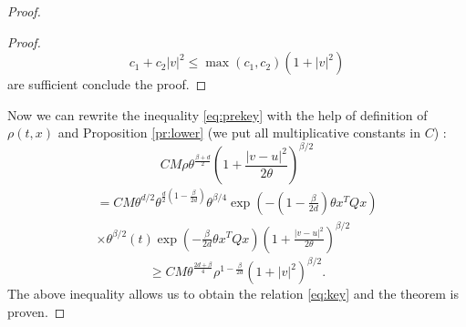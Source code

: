 \begin{proof}
\begin{proof}
\[c_1+c_2|v|^2\le \max (c_1,c_2)(1+|v|^2)\]
are sufficient conclude the proof.
\end{proof}
Now we can rewrite the inequality \eqref{eq:prekey} with the help of definition of $\rho(t,x)$ and Proposition \ref{pr:lower} (we put all multiplicative constants in $C$) :
\[CM \rho \theta^{\frac{\beta+d}{2}}\left(1+\frac{|v-u|^2}{2 \theta}\right)^{\beta/2}\]
\[\begin{split}
	=CM \theta^{d/2} \theta^{\frac{d}{2}\left(1-\frac{\beta}{2d}\right)} \theta^{\beta/4}\exp\left(-\left(1-\frac{\beta}{2d}\right)\theta x^TQx\right)\\\times\theta^{\beta/2} (t)\exp\left(-\frac{\beta}{2d}\theta x^TQx\right) \left(1+\frac{|v-u|^2}{2 \theta}\right)^{\beta/2}
\end{split}\]
\[\ge C M \theta^{\frac{2d+ \beta}{4}}\rho^{1-\frac{\beta}{2d}}(1+|v|^2)^{\beta/2}.\]
The above inequality allows us to obtain the relation \eqref{eq:key} and the theorem is proven.
\end{proof}



